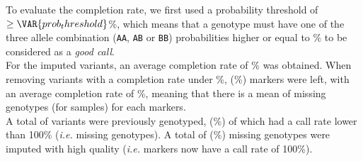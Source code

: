 
To evaluate the completion rate, we first used a probability threshold of
$\geq \VAR{ prob_threshold }$\%, which means that a genotype must have one of
the three allele combination (\texttt{AA}, \texttt{AB} or \texttt{BB})
probabilities higher or equal to \% to be considered as a
\textit{good call}.\\

For the  imputed variants, an average completion rate of
\% was obtained. When removing variants with a
completion rate under \%, 
(\%) markers were left, with an average completion rate
of \%, meaning that there is a mean of
 missing genotypes (for  samples) for
each markers.\\

A total of  variants were previously genotyped,
 (\%) of
which had  a call rate lower than 100\% (\textit{i.e.} 
missing genotypes). A total of 
(\%) missing genotypes were imputed with high
quality (\textit{i.e.}  markers now have a call
rate of 100\%).

